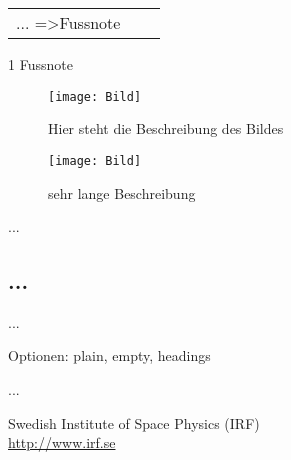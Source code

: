 
\begin{table}[h]
	\centering
	\caption{}
	\begin{threeparttable}
			\begin{tabular}{*{3}{l}}
			\toprule
			...
			\midrule
			=>Fussnote\tnote{1}
			\bottomrule
		\end{tabular}
		\begin{tablenotes}\footnotesize 
			\item[1] Fussnote
		\end{tablenotes}
	\end{threeparttable}
	\label{tab:}
\end{table}

\begin{wrapfigure}{r}{5cm}
\centering
\texttt{[image: Bild]}
\caption{Hier steht die Beschreibung des Bildes}
\end{wrapfigure}

\begin{figure}[htb]
\centering
\texttt{[image: Bild]}
\caption[Verzeichniseintrag]{sehr lange Beschreibung}
\end{figure}
...
\listoffigures

\begin{appendix}
\section{...}
...
\end{appendix}

\pagestyle{} %
\thispagestyle{} %
Optionen: plain, empty, headings

\usepackage{url} %
...
\begin{thebibliography}{9}
 Swedish Institute of Space Physics (IRF) \\ \url{http://www.irf.se}
\end{thebibliography}

\documentclass[11pt,twocolumn]{article}
\setlength{\columnsep}{distance}	%
\setlength{\columnseprule}{thickness}	%

